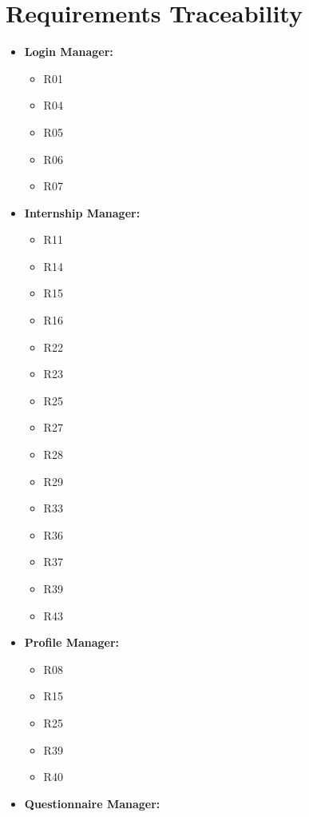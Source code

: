 \chapter{Requirements Traceability}
\label{ch:requirements-traceability}

\begin{itemize}
    \item \textbf{Login Manager:}
        \begin{itemize}
            \item R01
            \item R04
            \item R05
            \item R06
            \item R07
        \end{itemize}
    \item \textbf{Internship Manager:}
        \begin{itemize}
            \item R11
            \item R14
            \item R15
            \item R16
            \item R22
            \item R23
            \item R25
            \item R27
            \item R28
            \item R29
            \item R33
            \item R36
            \item R37
            \item R39
            \item R43
    \end{itemize}
    \item \textbf{Profile Manager:}
        \begin{itemize}
            \item R08
            \item R15
            \item R25
            \item R39
            \item R40
        \end{itemize}
    \item \textbf{Questionnaire Manager:}
        \begin{itemize}

\end{itemize}
\end{itemize}
